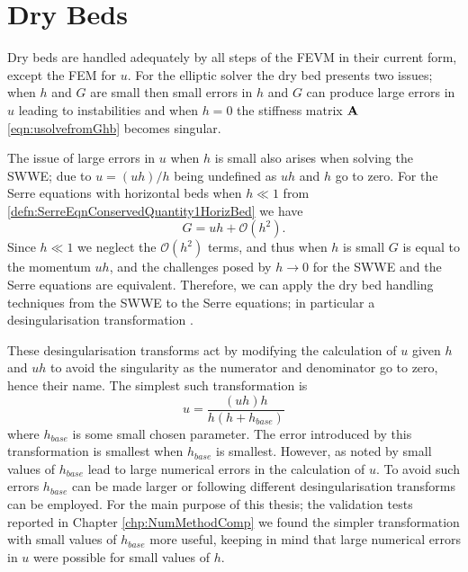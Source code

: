 \section{Dry Beds}
Dry beds are handled adequately by all steps of the FEVM in their current form, except the FEM for $u$. For the elliptic solver the dry bed presents two issues; when $h$ and $G$ are small then small errors in $h$ and $G$ can produce large errors in $u$ leading to instabilities and when $h=0$ the stiffness matrix $\mathbf{A}$ \eqref{eqn:usolvefromGhb} becomes singular.

The issue of large errors in $u$ when $h$ is small also arises when solving the SWWE; due to $u = (uh)/h $ being undefined as $u h $ and $h$ go to zero. For the Serre equations with horizontal beds when $h \ll 1$ from \eqref{defn:SerreEqnConservedQuantity1HorizBed} we have
\begin{equation}
G = uh + \mathcal{O}\left(h^2\right).
\end{equation}
Since $h \ll 1$ we neglect the $\mathcal{O}\left(h^2\right)$ terms, and thus when $h$ is small $G$ is equal to the momentum $uh$, and the challenges posed by $h \rightarrow 0$ for the SWWE and the Serre equations are equivalent. Therefore, we can apply the dry bed handling techniques from the SWWE to the Serre equations; in particular a desingularisation transformation \cite{Kurganov-Petrova-2007-707}. 

These desingularisation transforms act by modifying the calculation of $u$ given $h$ and $uh$ to avoid the singularity as the numerator and denominator go to zero, hence their name. The simplest such transformation is
\begin{equation}
u = \frac{(uh) h}{h\left(h + h_{base}\right)}
\label{eqn:calculationofugivenuhandh}
\end{equation}
where $h_{base}$ is some small chosen parameter. The error introduced by this transformation is smallest when $h_{base}$ is smallest. However, as noted by \citet{Kurganov-Petrova-2007-707} small values of $h_{base}$ lead to large numerical errors in the calculation of $u$. To avoid such errors $h_{base}$ can be made larger or following \citet{Kurganov-Petrova-2007-707} different desingularisation transforms can be employed. For the main purpose of this thesis; the validation tests reported in Chapter \ref{chp:NumMethodComp} we found the simpler transformation with small values of $h_{base}$ more useful, keeping in mind that large numerical errors in $u$ were possible for small values of $h$. 


